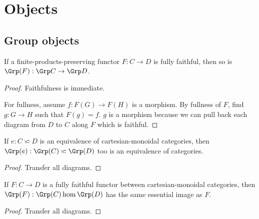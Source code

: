 \section{Objects}


\subsection{Group objects}


\begin{proposition}
  \label{0-full-faithful-grp}
  \leanok

  If a finite-products-preserving functor $F : C \to D$ is fully faithful,
  then so is $\Grp(F) : \Grp C \to \Grp D$.
\end{proposition}
\begin{proof}
  \leanok

  Faithfulness is immediate.

  For fullness, assume $f : F(G) \to F(H)$ is a morphism. By fullness of $F$,
  find $g : G \to H$ such that $F(g) = f$. $g$ is a morphism
  because we can pull back each diagram from $D$ to $C$ along $F$ which is faithful.
\end{proof}


\begin{proposition}
  \label{0-grp-equiv}
  \leanok

  If $e : C \backsimeq D$ is an equivalence of cartesian-monoidal categories,
  then $\Grp(e) : \Grp(C) \backsimeq \Grp(D)$ too is an equivalence of categories.
\end{proposition}
\begin{proof}
  \leanok

  Transfer all diagrams.
\end{proof}


\begin{proposition}
  \label{0-ess-image-grp}
  \leanok

  If $F : C \to D$ is a fully faithful functor between cartesian-monoidal categories,
  then $\Grp(F) : \Grp(C) \hom \Grp(D)$ has the same essential image as $F$.
\end{proposition}
\begin{proof}
  \leanok

  Transfer all diagrams.
\end{proof}


